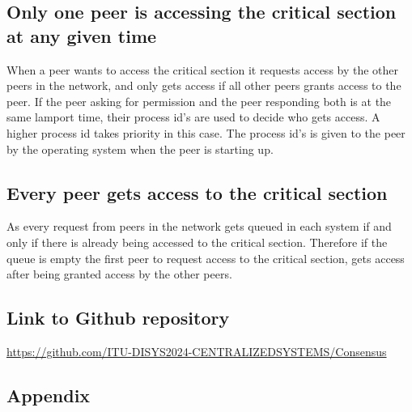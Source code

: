 \documentclass[a4paper,11pt]{article}
\begin{document}
\subsection*{Only one peer is accessing the critical section at any given time}
When a peer wants to access the critical section it requests access by the other peers in the network, and only gets access if all other peers grants access to the peer.
If the peer asking for permission and the peer responding both is at the same lamport time, their process id's are used to decide who gets access. A higher process id takes priority in this case.
The process id's is given to the peer by the operating system when the peer is starting up.

\subsection*{Every peer gets access to the critical section}
As every request from peers in the network gets queued in each system if and only if there is already being accessed to the critical section. 
Therefore if the queue is empty the first peer to request access to the critical section, gets access after being granted access by the other peers.


\newpage
\subsection*{Link to Github repository}

\href{https://github.com/ITU-DISYS2024-CENTRALIZEDSYSTEMS/Consensus}{https://github.com/ITU-DISYS2024-CENTRALIZEDSYSTEMS/Consensus}

\subsection*{Appendix}
\end{document}
